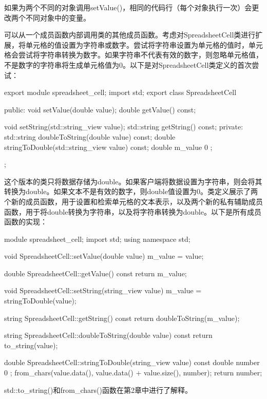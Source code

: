 如果为两个不同的对象调用setValue()，相同的代码行（每个对象执行一次）会更改两个不同对象中的变量。


可以从一个成员函数内部调用类的其他成员函数。考虑对SpreadsheetCell类进行扩展，将单元格的值设置为字符串或数字。尝试将字符串设置为单元格的值时，单元格会尝试将字符串转换为数字。如果字符串不代表有效的数字，则忽略单元格值，不是数字的字符串将生成单元格值为0。以下是对SpreadsheetCell类定义的首次尝试：

\begin{cpp}
export module spreadsheet_cell;
import std;
export class SpreadsheetCell
{
    public:
        void setValue(double value);
        double getValue() const;

        void setString(std::string_view value);
        std::string getString() const;
    private:
        std::string doubleToString(double value) const;
        double stringToDouble(std::string_view value) const;
        double m_value { 0 };
};
\end{cpp}

这个版本的类只将数据存储为double。如果客户端将数据设置为字符串，则会将其转换为double。如果文本不是有效的数字，则double值设置为0。类定义展示了两个新的成员函数，用于设置和检索单元格的文本表示，以及两个新的私有辅助成员函数，用于将double转换为字符串，以及将字符串转换为double。以下是所有成员函数的实现：

\begin{cpp}
module spreadsheet_cell;
import std;
using namespace std;

void SpreadsheetCell::setValue(double value)
{
    m_value = value;
}

double SpreadsheetCell::getValue() const
{
    return m_value;
}

void SpreadsheetCell::setString(string_view value)
{
    m_value = stringToDouble(value);
}

string SpreadsheetCell::getString() const
{
    return doubleToString(m_value);
}

string SpreadsheetCell::doubleToString(double value) const
{
    return to_string(value);
}

double SpreadsheetCell::stringToDouble(string_view value) const
{
    double number { 0 };
    from_chars(value.data(), value.data() + value.size(), number);
    return number;
}
\end{cpp}

std::to\_string()和from\_chars()函数在第2章中进行了解释。

